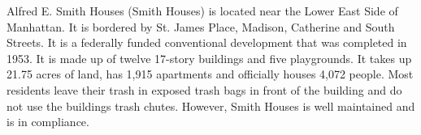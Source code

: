 Alfred E. Smith Houses (Smith Houses) is located near the Lower East Side of Manhattan. It is bordered by St. James Place, Madison, Catherine and South Streets. It is a federally funded conventional development that was completed in 1953. It is made up of twelve 17-story buildings and five playgrounds. It takes up 21.75 acres of land,  has 1,915 apartments and officially houses 4,072 people. Most residents leave their trash in exposed trash bags in front of the building and do not use the buildings trash chutes. However, Smith Houses is well maintained and is in compliance.